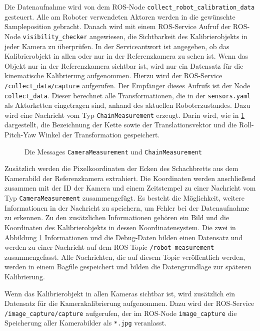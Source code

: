 Die Datenaufnahme wird von dem \ac{ROS}-Node \texttt{collect\_robot\_\allowbreak calibration\_\allowbreak data}
gesteuert. Alle am Roboter verwendeten Aktoren werden  in
die gewünschte Sampleposition gebracht. Danach wird mit einem \ac{ROS}-Service
Aufruf der \ac{ROS}-Node \texttt{visibility\_checker} angewiesen, die Sichtbarkeit
des Kalibrierobjekts in jeder Kamera zu überprüfen. In der Serviceantwort ist
angegeben, ob das 
Kalibrierobjekt in allen oder nur in der Referenzkamera zu sehen ist. 
Wenn das Objekt nur in der Referenzkamera sichtbar ist, wird nur ein Datensatz
für die kinematische Kalibrierung aufgenommen. Hierzu wird der \ac{ROS}-Service
\texttt{/collect\_data/capture} aufgerufen. Der Empfänger dieses Aufrufs ist 
der Node \texttt{collect\_data}. Dieser berechnet alle Transformationen, die in 
der \texttt{sensors.yaml} als Aktorketten eingetragen sind, anhand des aktuellen
Roboterzustandes. Dazu wird eine Nachricht vom Typ \texttt{ChainMeasurement}
erzeugt. Darin wird, wie in \ref{fig:messages} dargestellt, die Bezeichnung der 
Kette sowie der Translationsvektor und die Roll-Pitch-Yaw Winkel der Transformation 
gespeichert.
\begin{figure}[htpb]
  \centering
  
  \caption{Die Messages \texttt{CameraMeasurement} und \texttt{ChainMeasurement}}
  \label{fig:messages}
\end{figure}
Zusätzlich werden die Pixelkoordinaten der Ecken des Schachbretts
aus dem Kamerabild der Referenzkamera extrahiert. Die Koordinaten werden anschließend 
zusammen mit der ID der Kamera und einem Zeitstempel zu einer Nachricht vom Typ 
\texttt{CameraMeasurement} zusammengefügt. Es besteht die Möglichkeit, weitere Informationen
in der Nachricht zu speichern, um Fehler bei der Datenaufnahme zu erkennen.
Zu den zusätzlichen Informationen gehören ein Bild und die Koordinaten des 
Kalibrierobjekts in dessen Koordinatensystem. Die zwei in Abbildung \ref{fig:messages} Informationen und 
die Debug-Daten
bilden einen Datensatz und werden zu einer Nachricht auf dem \ac{ROS}-Topic
\texttt{/robot\_measurement} zusammengefasst. Alle Nachrichten, die auf diesem 
Topic veröffentlich werden, werden in einem Bagfile gespeichert und bilden die
Datengrundlage zur späteren Kalibrierung.

Wenn das Kalibrierobjekt in allen Kameras sichtbar ist, wird zusätzlich ein 
Datensatz für die Kamerakalibrierung aufgenommen. Dazu wird der \ac{ROS}-Service
\break \texttt{/image\_capture/\allowbreak capture} aufgerufen, der im \ac{ROS}-Node \texttt{image\_capture}
die Speicherung aller Kamerabilder als \texttt{*.jpg} veranlasst.

